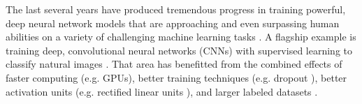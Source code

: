 \documentclass{article}
\begin{document}
The last several years have produced tremendous progress in training powerful, deep neural network models that are approaching and even surpassing human abilities on a variety of challenging machine learning tasks \cite{taigman-2014-CVPR-deepface:-closing-the-gap-to-human-level,schroff-2015-arXiv-facenet:-a-unified-embedding,hannun-2014-arXiv-deep-speech:-scaling}. A flagship example is training deep, convolutional neural networks (CNNs) with supervised learning to classify natural images \cite{krizhevsky2012imagenet-classification-with-deep}. That area has benefitted from the combined effects of faster computing (e.g. GPUs), better training techniques (e.g. dropout \cite{hinton2012improving-neural-networks-by-preventing}), better activation units (e.g. rectified linear units \cite{glorot-2011-AISTATS-deep-sparse-rectifier}), and larger labeled datasets  \cite{deng2009imagenet:-a-large-scale-hierarchical,lin-2014-arXiv-microsoft-coco-common}. 


\end{document}
